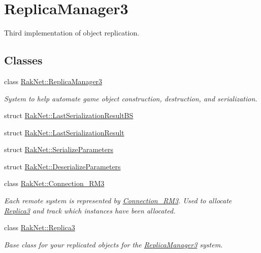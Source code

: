 \hypertarget{group___r_e_p_l_i_c_a___m_a_n_a_g_e_r___g_r_o_u_p3}{\section{Replica\-Manager3}
\label{group___r_e_p_l_i_c_a___m_a_n_a_g_e_r___g_r_o_u_p3}
}


Third implementation of object replication.  


\subsection*{Classes}
\begin{DoxyCompactItemize}
\item 
class \hyperlink{class_rak_net_1_1_replica_manager3}{Rak\-Net\-::\-Replica\-Manager3}
\begin{DoxyCompactList}\small\item\em System to help automate game object construction, destruction, and serialization. \end{DoxyCompactList}\item 
struct \hyperlink{struct_rak_net_1_1_last_serialization_result_b_s}{Rak\-Net\-::\-Last\-Serialization\-Result\-B\-S}
\item 
struct \hyperlink{struct_rak_net_1_1_last_serialization_result}{Rak\-Net\-::\-Last\-Serialization\-Result}
\item 
struct \hyperlink{struct_rak_net_1_1_serialize_parameters}{Rak\-Net\-::\-Serialize\-Parameters}
\item 
struct \hyperlink{struct_rak_net_1_1_deserialize_parameters}{Rak\-Net\-::\-Deserialize\-Parameters}
\item 
class \hyperlink{class_rak_net_1_1_connection___r_m3}{Rak\-Net\-::\-Connection\-\_\-\-R\-M3}
\begin{DoxyCompactList}\small\item\em Each remote system is represented by \hyperlink{class_rak_net_1_1_connection___r_m3}{Connection\-\_\-\-R\-M3}. Used to allocate \hyperlink{class_rak_net_1_1_replica3}{Replica3} and track which instances have been allocated. \end{DoxyCompactList}\item 
class \hyperlink{class_rak_net_1_1_replica3}{Rak\-Net\-::\-Replica3}
\begin{DoxyCompactList}\small\item\em Base class for your replicated objects for the \hyperlink{class_rak_net_1_1_replica_manager3}{Replica\-Manager3} system. \end{DoxyCompactList}\end{DoxyCompactItemize}

